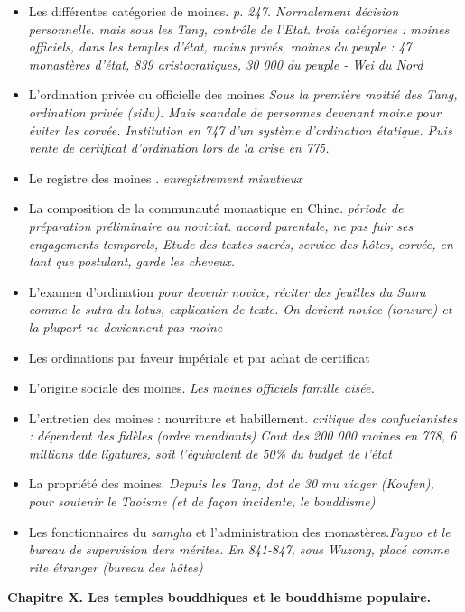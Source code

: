     \begin{itemize}
        \item Les différentes catégories de moines. \textit{p. 247. Normalement décision personnelle. mais sous les Tang, contrôle de l'Etat}. \textit{trois catégories : moines officiels, dans les temples d'état, moins privés, moines du peuple : 47 monastères d'état, 839 aristocratiques, 30 000 du peuple - Wei du Nord}
        \item L'ordination privée ou officielle des moines \textit{Sous la première moitié des Tang, ordination privée (sidu). Mais scandale de personnes devenant moine pour éviter les corvée. Institution en 747 d'un système d'ordination étatique. Puis vente de certificat d'ordination lors de la crise en 775. }
        \item Le registre des moines . \textit{enregistrement minutieux}
        \item La composition de la communauté monastique en Chine. \textit{période de préparation préliminaire au noviciat. accord parentale, ne pas fuir ses engagements temporels,  Etude des textes sacrés, service des hôtes, corvée, en tant que postulant, garde les cheveux. }
        \item L'examen d'ordination \textit{ pour devenir novice, réciter des feuilles du Sutra comme le sutra du lotus, explication de texte. On devient novice (tonsure) et la plupart ne deviennent pas moine}
        \item Les ordinations par faveur impériale et par achat de certificat
        \item L'origine sociale des moines. \textit{Les moines officiels famille aisée. }
        \item L'entretien des moines : nourriture et habillement. \textit{critique des confucianistes : dépendent des fidèles (ordre mendiants) Cout des 200 000 moines en 778, 6 millions dde ligatures, soit l'équivalent de 50\% du budget de l'état}
        \item La propriété des moines. \textit{Depuis les Tang, dot de 30 mu viager (Koufen), pour soutenir le Taoisme (et de façon incidente, le bouddisme)}
        \item Les fonctionnaires du \textit{samgha} et l'administration des monastères.\textit{Faguo et le bureau de supervision ders mérites. En 841-847, sous Wuzong, placé comme rite étranger (bureau des hôtes) }
    \end{itemize}

\textbf{Chapitre X. Les temples bouddhiques et le bouddhisme populaire.}

